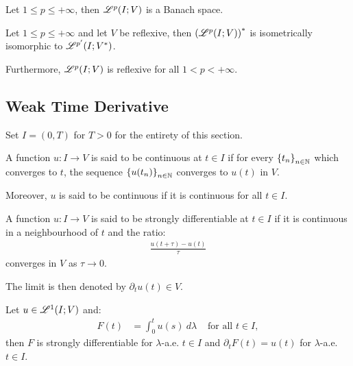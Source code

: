 \begin{theorem}
    Let $1 \leq p \leq +\infty$, then $\mathscr{L}^{p}(I; V)$ is a Banach space.
\end{theorem}

\begin{theorem} %
    Let $1 \leq p \leq +\infty$ and let $V$ be reflexive, then $\left( \mathscr{L}^{p}(I; V) \right)^*$ is isometrically isomorphic to $\mathscr{L}^{p^{\prime}}(I; V^*)$.

    Furthermore, $\mathscr{L}^{p}(I; V)$ is reflexive for all $1 < p < +\infty$.
\end{theorem}

\newpage
\subsection{Weak Time Derivative}

Set $I = (0, T)$ for $T > 0$ for the entirety of this section.

\begin{definition}[Continuity]
    A function $u\colon I \rightarrow V$ is said to be continuous at $t \in I$ if for every $\left\{ t_n \right\}_{n \in \mathbb{N}}$ which converges to $t$, the sequence $\left\{ u(t_n) \right\}_{n \in \mathbb{N}}$ converges to $u(t)$ in $V$.

    Moreover, $u$ is said to be continuous if it is continuous for all $t \in I$.
\end{definition}

\begin{definition}
    A function $u\colon I \rightarrow V$ is said to be strongly differentiable at $t \in I$ if it is continuous in a neighbourhood of $t$ and the ratio:
    \begin{align}
        \frac{u(t + \tau) - u(t)}{\tau}
    \end{align}
    converges in $V$ as $\tau \rightarrow 0$.

    The limit is then denoted by $\partial_t u(t) \in V$.
\end{definition}

\begin{theorem}
    Let $u \in \mathscr{L}^{1}(I; V)$ and:
    \begin{align}
        F(t) &= \int_0^t u(s) ~ d \lambda &\text{ for all } t \in I,
    \end{align}
    then $F$ is strongly differentiable for $\lambda$-a.e. $t \in I$ and $\partial_t F(t) = u(t)$ for $\lambda$-a.e. $t \in I$.
\end{theorem}

